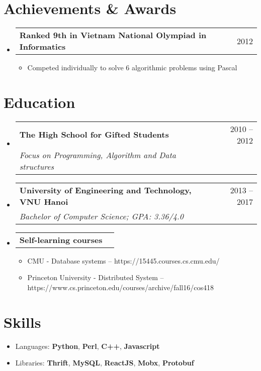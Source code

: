 \documentclass[a4paper,11pt]{article}
\makeatletter
\newcommand{\resumeItem}[1]{
  \item\small{
    {#1 \vspace{-2pt}}
  }
}
\newcommand{\resumeSubheadTwo}[2]{
  \vspace{-1pt}\item
    \begin{tabular*}{0.97\textwidth}{l@{\extracolsep{\fill}}r}
      \textbf{#1} & #2
    \end{tabular*}\vspace{-5pt}
}
\newcommand{\resumeSubhead}[3]{
  \vspace{-1pt}\item
    \begin{tabular*}{0.97\textwidth}{l@{\extracolsep{\fill}}r}
      \textbf{#1} & #2 \\
      \textit{\normalsize#3}
    \end{tabular*}\vspace{-5pt}
}
\newcommand{\resumeSubHeadingListStart}{\begin{itemize}[leftmargin=*]}
\newcommand{\resumeSubHeadingListEnd}{\end{itemize}}
\newcommand{\resumeItemListStart}{\begin{itemize}}
\newcommand{\resumeItemListEnd}{\end{itemize}\vspace{-5pt}}
\makeatother
\begin{document}
\section{Achievements \& Awards}
  \resumeSubHeadingListStart
    \resumeSubheadTwo
      {Ranked 9th in Vietnam National Olympiad in Informatics}{2012}
      \resumeItemListStart
        \resumeItem{Competed individually to solve 6 algorithmic problems using Pascal}
      \resumeItemListEnd
  \resumeSubHeadingListEnd



\section{Education}
  \resumeSubHeadingListStart
    \resumeSubhead
      {The High School for Gifted Students}{2010 -- 2012}
      {Focus on Programming, Algorithm and Data structures}
    \resumeSubhead
      {University of Engineering and Technology, VNU Hanoi}{2013 -- 2017}
      {Bachelor of Computer Science;  GPA: 3.36/4.0}
    \resumeSubheadTwo
      {Self-learning courses}{}
      \resumeItemListStart
        \resumeItem{CMU - Database systems -- https://15445.courses.cs.cmu.edu/}
        \resumeItem{Princeton University - Distributed System -- https://www.cs.princeton.edu/courses/archive/fall16/cos418}
      \resumeItemListEnd
  \resumeSubHeadingListEnd

\section{Skills}
  \resumeItemListStart
    \resumeItem{Languages: \textbf{Python}, \textbf{Perl}, \textbf{C++}, \textbf{Javascript}}
    \resumeItem{Libraries: \textbf{Thrift}, \textbf{MySQL}, \textbf{ReactJS}, \textbf{Mobx}, \textbf{Protobuf}}
  \resumeItemListEnd
\end{document}
